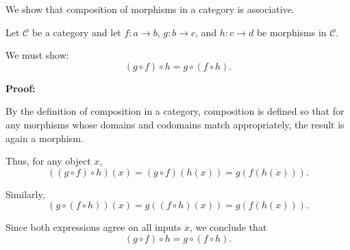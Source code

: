 \documentclass[12pt]{article}
\begin{document}
We show that composition of morphisms in a category is associative.

Let $\mathcal{C}$ be a category and let
$f: a \to b$, $g: b \to c$, and $h: c \to d$ be morphisms in $\mathcal{C}$.

We must show:
\[
(g \circ f) \circ h = g \circ (f \circ h).
\]

\textbf{Proof:}

By the definition of composition in a category, composition is defined so that
for any morphisms whose domains and codomains match appropriately, the result
is again a morphism.

Thus, for any object $x$,
\[
((g \circ f) \circ h)(x)
= (g \circ f)(h(x))
= g(f(h(x))).
\]

Similarly,
\[
(g \circ (f \circ h))(x)
= g((f \circ h)(x))
= g(f(h(x))).
\]

Since both expressions agree on all inputs $x$, we conclude that
\[
(g \circ f) \circ h = g \circ (f \circ h).
\]
\end{document}
